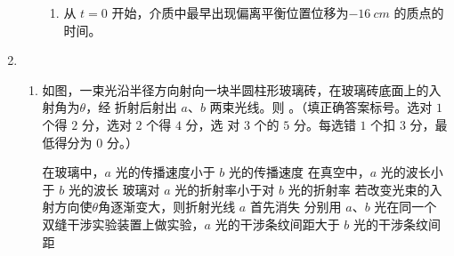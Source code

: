 \begin{enumerate}
\begin{enumerate}
\begin{enumerate}
\item 
从 $ t=0 $ 开始，介质中最早出现偏离平衡位置位移为$ -16 \ cm $ 的质点的时间。

	
\end{enumerate}
\begin{figure}[h!]
	\flushright
	
\end{figure}





\end{enumerate}


\item 
{}
\begin{enumerate}
	\item
如图，一束光沿半径方向射向一块半圆柱形玻璃砖，在玻璃砖底面上的入射角为$ \theta $，经
折射后射出 $ a $、$ b $ 两束光线。则 \underlinegap 。（填正确答案标号。选对 $ 1 $ 个得 $ 2 $ 分，选对 $ 2 $ 个得 $ 4 $ 分，选
对 $ 3 $ 个的 $ 5 $ 分。每选错 $ 1 $ 个扣 $ 3 $ 分，最低得分为 $ 0 $ 分。）
\begin{figure}[h!]
	\centering
	
\end{figure}

\fivechoices
{在玻璃中，$ a $ 光的传播速度小于 $ b $ 光的传播速度}
{在真空中，$ a $ 光的波长小于 $ b $ 光的波长}
{玻璃对 $ a $ 光的折射率小于对 $ b $ 光的折射率}
{若改变光束的入射方向使$ \theta $角逐渐变大，则折射光线 $ a $ 首先消失}
{分别用 $ a $、$ b $ 光在同一个双缝干涉实验装置上做实验，$ a $ 光的干涉条纹间距大于 $ b $ 光的干涉条纹间距}


\end{enumerate}
\end{enumerate}
